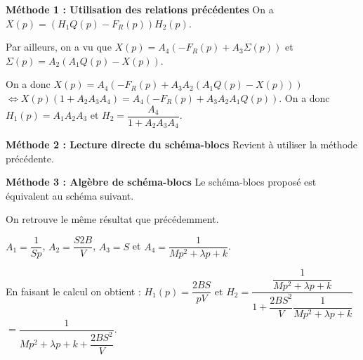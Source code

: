 \ifprof
\begin{corrige}
\textbf{Méthode 1 : Utilisation des relations précédentes}
On a $X(p)=\left(H_1Q(p)-F_R(p)\right)H_2(p)$. 

Par ailleurs, on a vu que $X(p)=A_4\left(-F_R(p)+A_3\Sigma(p)\right) $ et $\Sigma(p)=A_2\left(A_1Q(p)-X(p)\right)$. 

On a donc $X(p)=A_4\left(-F_R(p)+A_3  A_2\left(A_1Q(p)-X(p)\right)\right) $ $ \Leftrightarrow X(p)\left(1+A_2A_3A_4 \right)=A_4\left(-F_R(p)+A_3  A_2A_1Q(p)\right) $. On a donc 
$H_1(p)=A_1  A_2A_3$ et $H_2 = \dfrac{A_4}{1+ A_2A_3A_4 }$.

\textbf{Méthode 2 : Lecture directe du schéma-blocs}
Revient à utiliser la méthode précédente. 

\textbf{Méthode 3 : Algèbre de schéma-blocs}
Le schéma-blocs proposé est équivalent au schéma suivant. 

\footnotesize
\begin{center}
\end{center}
\normalsize

On retrouve le même résultat que précédemment. 


$A_1=\dfrac{1}{Sp}$,  $A_2 = \dfrac{S2B}{V} $,  $A_3 = S$  et $A_4 = \dfrac{1}{Mp^2  +\lambda p  + k}$.


En faisant le calcul on obtient : 
$H_1(p)=\dfrac{2BS}{pV}  $ et $H_2 = \dfrac{\dfrac{1}{Mp^2  +\lambda p  + k}}{1+ \dfrac{2BS^2}{V}\dfrac{1}{Mp^2  +\lambda p  + k} }$  $= \dfrac{1}{Mp^2  +\lambda p  + k+ \dfrac{2BS^2}{V} }$.

\end{corrige}
\else
\fi

